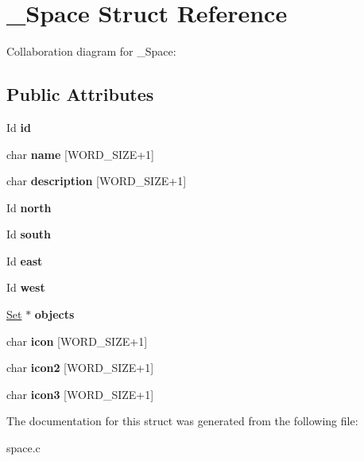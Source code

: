 \hypertarget{struct__Space}{}\section{\+\_\+\+Space Struct Reference}
\label{struct__Space}


Collaboration diagram for \+\_\+\+Space\+:
\subsection*{Public Attributes}
\begin{DoxyCompactItemize}
\item 
\mbox{\label{struct__Space_a70cb461deb9ac073e401b607339b567f}} 
Id {\bfseries id}
\item 
\mbox{\label{struct__Space_aa1c9c994c2d16ecf3ef46138685fdfdc}} 
char {\bfseries name} \mbox{[}W\+O\+R\+D\+\_\+\+S\+I\+ZE+1\mbox{]}
\item 
\mbox{\label{struct__Space_a41a1dbfab1d88b732db50d7335c2f328}} 
char {\bfseries description} \mbox{[}W\+O\+R\+D\+\_\+\+S\+I\+ZE+1\mbox{]}
\item 
\mbox{\label{struct__Space_ae5ebe53ce79514d7d2d93911e0159252}} 
Id {\bfseries north}
\item 
\mbox{\label{struct__Space_a646b68c22a0bbf1685033c96109d31d1}} 
Id {\bfseries south}
\item 
\mbox{\label{struct__Space_a41ce2bf33cf0c157b358221f094ee05b}} 
Id {\bfseries east}
\item 
\mbox{\label{struct__Space_a20c1d259e93b44e24ba82982e142eb9b}} 
Id {\bfseries west}
\item 
\mbox{\label{struct__Space_a661ed8b0fc8085b6db70188aa5085625}} 
\hyperlink{struct__Set}{Set} $\ast$ {\bfseries objects}
\item 
\mbox{\label{struct__Space_ad3140cdc2a80c0112f252e0c68fc7f07}} 
char {\bfseries icon} \mbox{[}W\+O\+R\+D\+\_\+\+S\+I\+ZE+1\mbox{]}
\item 
\mbox{\label{struct__Space_a21a2b9e552f2e1acba97ff314e89723f}} 
char {\bfseries icon2} \mbox{[}W\+O\+R\+D\+\_\+\+S\+I\+ZE+1\mbox{]}
\item 
\mbox{\label{struct__Space_aa66ff63a7f86a0534c004dccb6f4c6c5}} 
char {\bfseries icon3} \mbox{[}W\+O\+R\+D\+\_\+\+S\+I\+ZE+1\mbox{]}
\end{DoxyCompactItemize}


The documentation for this struct was generated from the following file\+:\begin{DoxyCompactItemize}
\item 
space.\+c\end{DoxyCompactItemize}

